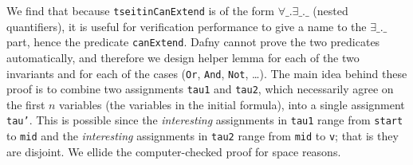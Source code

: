 \documentclass[12pt]{report}
\begin{document}
We find that because \texttt{tseitinCanExtend} is of the form
\( \forall \_ . \exists \_ . \_ \) (nested quantifiers), it is useful
for verification performance to give a name to the
\( \exists \_ . \_ \) part, hence the predicate \texttt{canExtend}.
Dafny cannot prove the two predicates automatically, and therefore we
design helper lemma for each of the two invariants and for each of the
cases (\texttt{Or}, \texttt{And}, \texttt{Not}, \ldots).%
%
%
%
%
%
The main idea behind these proof is to combine two assignments
\texttt{tau1} and \texttt{tau2}, which necessarily agree on the first
\( n \) variables (the variables in the initial formula), into a
single assignment \texttt{tau'}. This is possible since the
\emph{interesting} assignments in \texttt{tau1} range from
\texttt{start} to \texttt{mid} and the \emph{interesting} assignments
in \texttt{tau2} range from \texttt{mid} to \texttt{v}; that is they
are disjoint. We ellide the computer-checked proof for space reasons.
\end{document}
